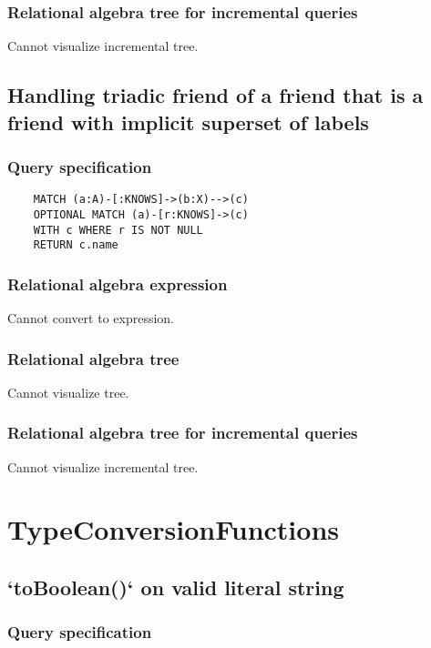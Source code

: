 	\subsubsection*{Relational algebra tree for incremental queries}

	Cannot visualize incremental tree.
	\subsection{Handling triadic friend of a friend that is a friend with implicit superset of labels}

	\subsubsection*{Query specification}

	\begin{lstlisting}
	MATCH (a:A)-[:KNOWS]->(b:X)-->(c)
	OPTIONAL MATCH (a)-[r:KNOWS]->(c)
	WITH c WHERE r IS NOT NULL
	RETURN c.name
	\end{lstlisting}


	\subsubsection*{Relational algebra expression}

	Cannot convert to expression.

	\subsubsection*{Relational algebra tree}

	Cannot visualize tree.

	\subsubsection*{Relational algebra tree for incremental queries}

	Cannot visualize incremental tree.

	\section{TypeConversionFunctions}

	\subsection{`toBoolean()` on valid literal string}

	\subsubsection*{Query specification}

